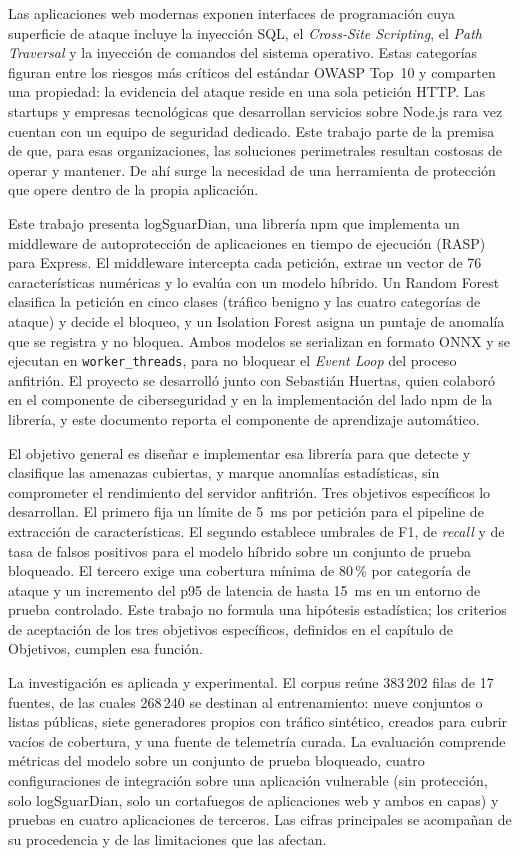 Las aplicaciones web modernas exponen interfaces de programación cuya superficie de ataque incluye la inyección SQL, el \textit{Cross-Site Scripting}, el \textit{Path Traversal} y la inyección de comandos del sistema operativo. Estas categorías figuran entre los riesgos más críticos del estándar OWASP Top~10 \parencite{owasp2021} y comparten una propiedad: la evidencia del ataque reside en una sola petición HTTP. Las startups y empresas tecnológicas que desarrollan servicios sobre Node.js rara vez cuentan con un equipo de seguridad dedicado. Este trabajo parte de la premisa de que, para esas organizaciones, las soluciones perimetrales resultan costosas de operar y mantener. De ahí surge la necesidad de una herramienta de protección que opere dentro de la propia aplicación.

Este trabajo presenta logSguarDian, una librería npm que implementa un middleware de autoprotección de aplicaciones en tiempo de ejecución (RASP) para Express. El middleware intercepta cada petición, extrae un vector de 76 características numéricas y lo evalúa con un modelo híbrido. Un Random Forest clasifica la petición en cinco clases (tráfico benigno y las cuatro categorías de ataque) y decide el bloqueo, y un Isolation Forest asigna un puntaje de anomalía que se registra y no bloquea. Ambos modelos se serializan en formato ONNX y se ejecutan en \texttt{worker\_threads}, para no bloquear el \textit{Event Loop} del proceso anfitrión. El proyecto se desarrolló junto con Sebastián Huertas, quien colaboró en el componente de ciberseguridad y en la implementación del lado npm de la librería, y este documento reporta el componente de aprendizaje automático.

El objetivo general es diseñar e implementar esa librería para que detecte y clasifique las amenazas cubiertas, y marque anomalías estadísticas, sin comprometer el rendimiento del servidor anfitrión. Tres objetivos específicos lo desarrollan. El primero fija un límite de 5~ms por petición para el pipeline de extracción de características. El segundo establece umbrales de F1, de \textit{recall} y de tasa de falsos positivos para el modelo híbrido sobre un conjunto de prueba bloqueado. El tercero exige una cobertura mínima de 80\,\% por categoría de ataque y un incremento del p95 de latencia de hasta 15~ms en un entorno de prueba controlado. Este trabajo no formula una hipótesis estadística; los criterios de aceptación de los tres objetivos específicos, definidos en el capítulo de Objetivos, cumplen esa función.

La investigación es aplicada y experimental. El corpus reúne 383\,202 filas de 17 fuentes, de las cuales 268\,240 se destinan al entrenamiento: nueve conjuntos o listas públicas, siete generadores propios con tráfico sintético, creados para cubrir vacíos de cobertura, y una fuente de telemetría curada. La evaluación comprende métricas del modelo sobre un conjunto de prueba bloqueado, cuatro configuraciones de integración sobre una aplicación vulnerable (sin protección, solo logSguarDian, solo un cortafuegos de aplicaciones web y ambos en capas) y pruebas en cuatro aplicaciones de terceros. Las cifras principales se acompañan de su procedencia y de las limitaciones que las afectan.

